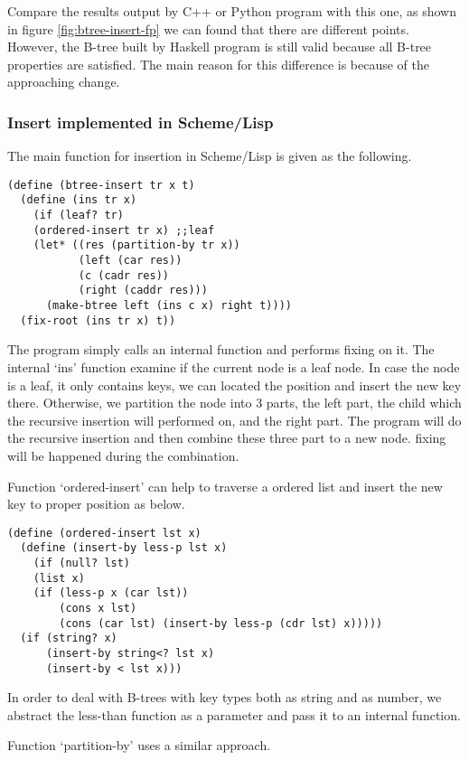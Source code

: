 \documentclass{article}
\begin{document}
Compare the results output by C++ or Python program with this one,
as shown in figure \ref{fig:btree-insert-fp}
we can found that there are different points. However, the B-tree
built by Haskell program is still valid because all B-tree properties
are satisfied. The main reason for this difference is because of
the approaching change.

\subsubsection*{Insert implemented in Scheme/Lisp}
The main function for insertion in Scheme/Lisp is given as the 
following.

\lstset{language=lisp}
\begin{lstlisting}
(define (btree-insert tr x t)
  (define (ins tr x)
    (if (leaf? tr)
	(ordered-insert tr x) ;;leaf
	(let* ((res (partition-by tr x))
	       (left (car res))
	       (c (cadr res))
	       (right (caddr res)))
	  (make-btree left (ins c x) right t))))
  (fix-root (ins tr x) t))
\end{lstlisting}

The program simply calls an internal function and performs fixing
on it. The internal `ins' function examine if the current node
is a leaf node. In case the node is a leaf, it only contains keys,
we can located the position and insert the new key there. Otherwise,
we partition the node into 3 parts, the left part, the child which
the recursive insertion will performed on, and the right part.
The program will do the recursive insertion and then combine 
these three part to a new node. fixing will be happened during the
combination.

Function `ordered-insert' can help to traverse a ordered list
and insert the new key to proper position as below.

\begin{lstlisting}
(define (ordered-insert lst x)
  (define (insert-by less-p lst x)
    (if (null? lst)
	(list x)
	(if (less-p x (car lst))
	    (cons x lst)
	    (cons (car lst) (insert-by less-p (cdr lst) x)))))
  (if (string? x)
      (insert-by string<? lst x)
      (insert-by < lst x)))
\end{lstlisting}

In order to deal with B-trees with key types both as string and
as number, we abstract the less-than function as a parameter
and pass it to an internal function.

Function `partition-by' uses a similar approach.
\end{document}
